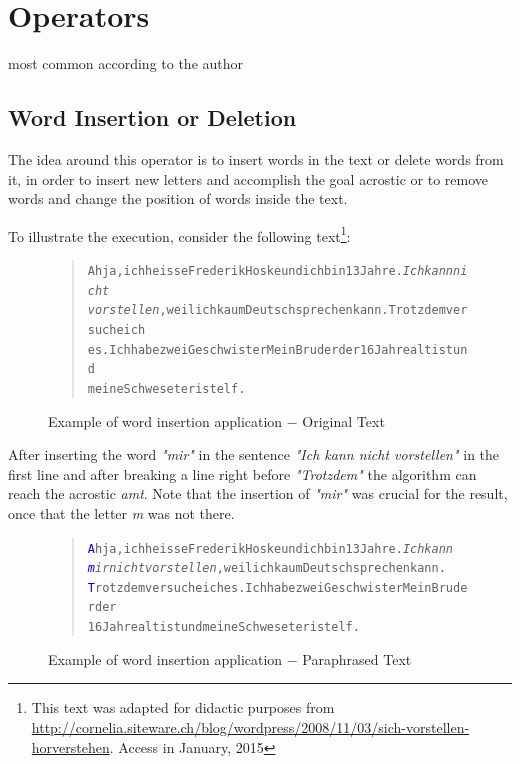 \documentclass[11pt]{reportAlternative}
\begin{document}
\section{Operators}
most common according to the author

\subsection{Word Insertion or Deletion}
The idea around this operator is to insert words in the text or delete words from it, in order to insert new letters and accomplish the goal acrostic or to remove words and change the position of words inside the text. \par

To illustrate the execution, consider the following text\footnote{This text was adapted for didactic purposes from \url{http://cornelia.siteware.ch/blog/wordpress/2008/11/03/sich-vorstellen-horverstehen}. Access in January, 2015}:

\begin{figure}[H]
\begin{quote}
\begin{alltt}
Ah ja, ich heisse Frederik Hoske und ich bin 13 Jahre. \textit{Ich kann nicht
vorstellen}, weil ich kaum Deutsch sprechen kann. Trotzdem versuche ich
es. Ich habe zwei Geschwister Mein Bruder der 16 Jahre alt ist und
meine Schweseter ist elf.
\end{alltt}
\end{quote}
\caption{Example of word insertion application $-$ Original Text}
\end{figure}

After inserting the word \emph{"mir"} in the sentence \emph{"Ich kann nicht vorstellen"} in the first line and after breaking a line right before \emph{"Trotzdem"} the algorithm can reach the acrostic \emph{amt}. Note that the insertion of \emph{"mir"} was crucial for the result, once that the letter \emph{m} was not there.

\begin{figure}[H]
\begin{quote}
\begin{alltt}
\textcolor{Blue}{A}h ja, ich heisse Frederik Hoske und ich bin 13 Jahre. \textit{Ich kann
\textcolor{Blue}{m}ir nicht vorstellen}, weil ich kaum Deutsch sprechen kann.
\textcolor{Blue}{T}rotzdem versuche ich es. Ich habe zwei Geschwister Mein Bruder der
16 Jahre alt ist und meine Schweseter ist elf.
\end{alltt}
\end{quote}
\caption{Example of word insertion application $-$ Paraphrased Text}
\end{figure}
\end{document}
